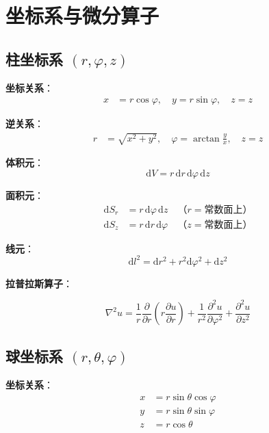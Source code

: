 
\chapter{坐标系与微分算子}

\section{柱坐标系 $(r, \varphi, z)$}

\textbf{坐标关系}：
\begin{align}
    x &= r\cos\varphi, \quad y = r\sin\varphi, \quad z = z
\end{align}

\textbf{逆关系}：
\begin{align}
    r &= \sqrt{x^2 + y^2}, \quad \varphi = \arctan\frac{y}{x}, \quad z = z
\end{align}

\textbf{体积元}：
\begin{equation}
    \mathrm{d}V = r\,\mathrm{d}r\,\mathrm{d}\varphi\,\mathrm{d}z
\end{equation}

\textbf{面积元}：
\begin{align}
    \mathrm{d}S_r &= r\,\mathrm{d}\varphi\,\mathrm{d}z \quad \text{（$r=$常数面上）} \\
    \mathrm{d}S_z &= r\,\mathrm{d}r\,\mathrm{d}\varphi \quad \text{（$z=$常数面上）}
\end{align}

\textbf{线元}：
\begin{equation}
    \mathrm{d}l^2 = \mathrm{d}r^2 + r^2\mathrm{d}\varphi^2 + \mathrm{d}z^2
\end{equation}

\textbf{拉普拉斯算子}：
\begin{zhongyao}[柱坐标系拉普拉斯算子]
\[
    \nabla^2 u = \frac{1}{r}\frac{\partial}{\partial r}\left(r\frac{\partial u}{\partial r}\right) + \frac{1}{r^2}\frac{\partial^2 u}{\partial\varphi^2} + \frac{\partial^2 u}{\partial z^2}
\]
\end{zhongyao}

\section{球坐标系 $(r, \theta, \varphi)$}

\textbf{坐标关系}：
\begin{align}
    x &= r\sin\theta\cos\varphi \\
    y &= r\sin\theta\sin\varphi \\
    z &= r\cos\theta
\end{align}

